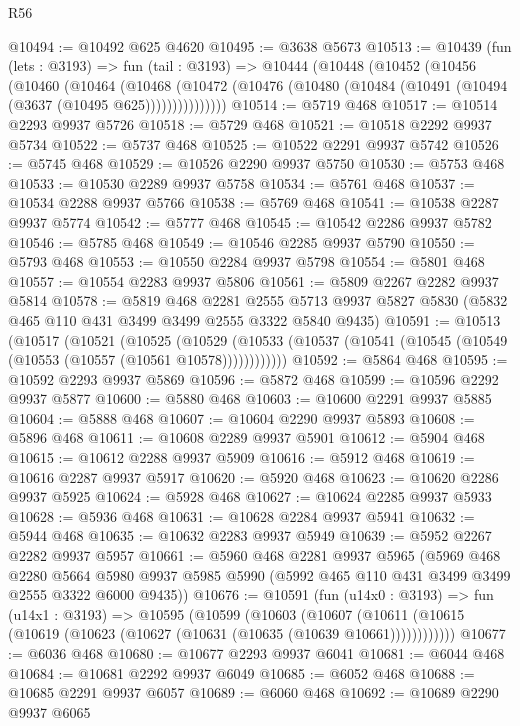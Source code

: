 \begin{lexlean}{R56}
\begin{coremodule}
@10494 := @10492 @625 @4620
@10495 := @3638 @5673
@10513 := @10439
    (fun (lets : @3193) =>
    fun (tail : @3193) =>
    @10444
      (@10448
        (@10452
          (@10456
            (@10460
              (@10464
                (@10468
                  (@10472 (@10476 (@10480 (@10484 (@10491 (@10494 (@3637 (@10495 @625)))))))))))))))
@10514 := @5719 @468
@10517 := @10514 @2293 @9937 @5726
@10518 := @5729 @468
@10521 := @10518 @2292 @9937 @5734
@10522 := @5737 @468
@10525 := @10522 @2291 @9937 @5742
@10526 := @5745 @468
@10529 := @10526 @2290 @9937 @5750
@10530 := @5753 @468
@10533 := @10530 @2289 @9937 @5758
@10534 := @5761 @468
@10537 := @10534 @2288 @9937 @5766
@10538 := @5769 @468
@10541 := @10538 @2287 @9937 @5774
@10542 := @5777 @468
@10545 := @10542 @2286 @9937 @5782
@10546 := @5785 @468
@10549 := @10546 @2285 @9937 @5790
@10550 := @5793 @468
@10553 := @10550 @2284 @9937 @5798
@10554 := @5801 @468
@10557 := @10554 @2283 @9937 @5806
@10561 := @5809 @2267 @2282 @9937 @5814
@10578 := @5819
    @468
    @2281
    @2555
    @5713
    @9937
    @5827
    @5830
    (@5832 @465 @110 @431 @3499 @3499 @2555 @3322 @5840 @9435)
@10591 := @10513
    (@10517
      (@10521
        (@10525
          (@10529 (@10533 (@10537 (@10541 (@10545 (@10549 (@10553 (@10557 (@10561 @10578))))))))))))
@10592 := @5864 @468
@10595 := @10592 @2293 @9937 @5869
@10596 := @5872 @468
@10599 := @10596 @2292 @9937 @5877
@10600 := @5880 @468
@10603 := @10600 @2291 @9937 @5885
@10604 := @5888 @468
@10607 := @10604 @2290 @9937 @5893
@10608 := @5896 @468
@10611 := @10608 @2289 @9937 @5901
@10612 := @5904 @468
@10615 := @10612 @2288 @9937 @5909
@10616 := @5912 @468
@10619 := @10616 @2287 @9937 @5917
@10620 := @5920 @468
@10623 := @10620 @2286 @9937 @5925
@10624 := @5928 @468
@10627 := @10624 @2285 @9937 @5933
@10628 := @5936 @468
@10631 := @10628 @2284 @9937 @5941
@10632 := @5944 @468
@10635 := @10632 @2283 @9937 @5949
@10639 := @5952 @2267 @2282 @9937 @5957
@10661 := @5960
    @468
    @2281
    @9937
    @5965
    (@5969
      @468
      @2280
      @5664
      @5980
      @9937
      @5985
      @5990
      (@5992 @465 @110 @431 @3499 @3499 @2555 @3322 @6000 @9435))
@10676 := @10591
    (fun (u14x0 : @3193) =>
    fun (u14x1 : @3193) =>
    @10595
      (@10599
        (@10603
          (@10607 (@10611 (@10615 (@10619 (@10623 (@10627 (@10631 (@10635 (@10639 @10661))))))))))))
@10677 := @6036 @468
@10680 := @10677 @2293 @9937 @6041
@10681 := @6044 @468
@10684 := @10681 @2292 @9937 @6049
@10685 := @6052 @468
@10688 := @10685 @2291 @9937 @6057
@10689 := @6060 @468
@10692 := @10689 @2290 @9937 @6065

\end{coremodule}
\end{lexlean}
